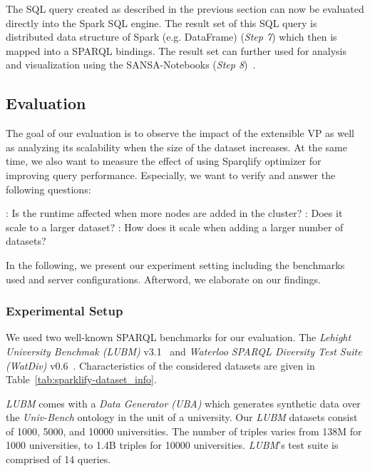 The SQL query created as described in the previous section can now be evaluated directly into the Spark SQL engine.
The result set of this SQL query is distributed data structure of Spark (e.g. DataFrame) (\textit{Step 7}) which then is mapped into a \gls{SPARQL} bindings.
The result set can further used for analysis and visualization using the SANSA-Notebooks (\textit{Step 8})~\cite{iermilov-2017-sansa-iswc-demo}.


\subsection{Evaluation}
\label{sec:sparklify-evaluation}
The goal of our evaluation is to observe the impact of the extensible \gls{VP} as well as analyzing its scalability when the size of the dataset increases.
At the same time, we also want to measure the effect of using Sparqlify optimizer for improving query performance.
Especially, we want to verify and answer the following questions:
\begin{itemize}
\addtolength{\itemindent}{1cm}
    \newitem[Q1]\label{item:Q1}: Is the runtime affected when more nodes are added in the cluster?
    \newitem[Q2]\label{item:Q2}: Does it scale to a larger dataset?
    \newitem[Q3]\label{item:Q3}: How does it scale when adding a larger number of datasets?
\end{itemize}
In the following, we present our experiment setting including the benchmarks used and server configurations. 
Afterword, we elaborate on our findings.

\subsubsection{Experimental Setup}
We used two well-known \gls{SPARQL} benchmarks for our evaluation. 
The \textit{Lehight University Benchmak (LUBM)} v3.1~\cite{Guo2005LUBMAB} and \textit{Waterloo \gls{SPARQL} Diversity Test Suite (WatDiv)} v0.6~\cite{Alu2014DiversifiedST}.
Characteristics of the considered datasets are given in Table~\ref{tab:sparklify-dataset_info}.

\textit{LUBM} comes with a \textit{Data Generator (UBA)} which generates synthetic data over the \textit{Univ-Bench} ontology in the unit of a university.
Our \textit{LUBM} datasets consist of 1000, 5000, and 10000 universities.
The number of triples varies from 138M for 1000 universities, to 1.4B triples for 10000 universities.
\textit{LUBM}'s test suite is comprised of 14 queries.


